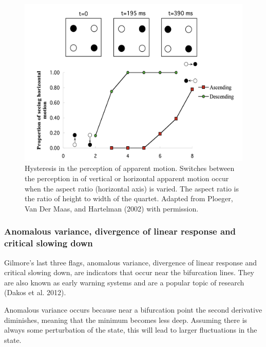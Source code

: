 \documentclass[
  a4paper,
  DIV=11,
  numbers=noendperiod,
  oneside]{scrreprt}
\begin{document}
\begin{figure}

{\centering \includegraphics{media/ch3/image22.jpg}

}

\caption{\label{fig-ch3-img22-old-34}Hysteresis in the perception of
apparent motion. Switches between the perception in of vertical or
horizontal apparent motion occur when the aspect ratio (horizontal axis)
is varied. The aspect ratio is the ratio of height to width of the
quartet. Adapted from Ploeger, Van Der Maas, and Hartelman (2002) with
permission.}

\end{figure}

\hypertarget{sec-Anomalous-variance-divergence-of-linear-response-and-critical-slowing-down}{%
\subsubsection{Anomalous variance, divergence of linear response and
critical slowing
down}\label{sec-Anomalous-variance-divergence-of-linear-response-and-critical-slowing-down}}

Gilmore's last three flags, anomalous variance, divergence of linear
response and critical slowing down, are indicators that occur near the
bifurcation lines. They are also known as early warning systems and are
a popular topic of research (Dakos et al. 2012).

Anomalous variance occurs because near a bifurcation point the second
derivative diminishes, meaning that the minimum becomes less deep.
Assuming there is always some perturbation of the state, this will lead
to larger fluctuations in the state.
\end{document}
